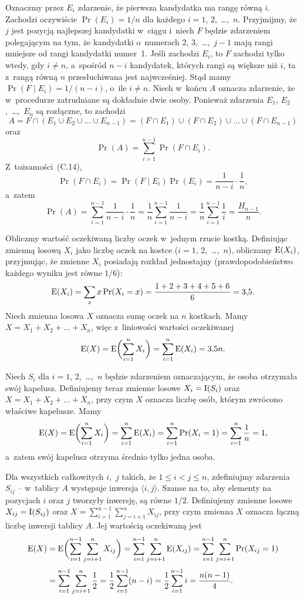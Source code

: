 Oznaczmy przez $E_i$ zdarzenie, że pierwsza kandydatka ma rangę równą $i$. Zachodzi oczywiście $\Pr(E_i)=1/n$ dla każdego $i=1$, 2,~\dots,~$n$. Przyjmijmy, że $j$ jest pozycją najlepszej kandydatki w~ciągu i~niech $F$ będzie zdarzeniem polegającym na tym, że kandydatki o~numerach 2, 3,~\dots,~$j-1$ mają rangi mniejsze od rangi kandydatki numer~1. Jeśli zachodzi $E_i$, to $F$ zachodzi tylko wtedy, gdy $i\ne n$, a~spośród $n-i$ kandydatek, których rangi są większe niż $i$, ta z~rangą równą $n$ przesłuchiwana jest najwcześniej. Stąd mamy $\Pr(F\mid E_i)=1/(n-i)$, o~ile $i\ne n$. Niech w~końcu $A$ oznacza zdarzenie, że w~procedurze  zatrudniane są dokładnie dwie osoby. Ponieważ zdarzenia $E_1$, $E_2$,~\dots,~$E_n$ są rozłączne, to zachodzi
\[
	A = F\cap(E_1\cup E_2\cup\dots\cup E_{n-1}) = (F\cap E_1)\cup(F\cap E_2)\cup\dots\cup(F\cap E_{n-1})
\]
oraz
\[
	\Pr(A) = \sum_{i=1}^{n-1}\Pr(F\cap E_i).
\]
Z~tożsamości~(C.14),
\[
	\Pr(F\cap E_i) = \Pr(F\mid E_i)\Pr(E_i) = \frac{1}{n-i}\cdot\frac{1}{n},
\]
a~zatem
\[
	\Pr(A) = \sum_{i=1}^{n-1}\frac{1}{n-i}\cdot\frac{1}{n} = \frac{1}{n}\sum_{i=1}^{n-1}\frac{1}{n-i} = \frac{1}{n}\sum_{i=1}^{n-1}\frac{1}{i} = \frac{H_{n-1}}{n}.
\]

\exercise %
Obliczmy wartość oczekiwaną liczby oczek w~jednym rzucie kostką. Definiując zmienną losową $X_i$ jako liczbę oczek na  kostce ($i=1$, 2,~\dots,~$n$), obliczamy $\operatorname{E}(X_i)$, przyjmując, że zmienne $X_i$ posiadają rozkład jednostajny (prawdopodobieństwo każdego wyniku jest równe $1/6$):
\[
	\operatorname{E}(X_i) = \sum_xx\Pr(X_i=x) = \frac{1+2+3+4+5+6}{6} = 3{,}5.
\]
Niech zmienna losowa $X$ oznacza sumę oczek na $n$ kostkach. Mamy $X=X_1+X_2+\dots+X_n$, więc z~liniowości wartości oczekiwanej
\[
	\operatorname{E}(X) = \operatorname{E}\biggl(\sum_{i=1}^nX_i\biggr) = \sum_{i=1}^n\operatorname{E}(X_i) = 3{,}5n.
\]

\exercise %
Niech $S_i$ dla $i=1$, 2,~\dots,~$n$ będzie zdarzeniem oznaczającym, że  osoba otrzymała swój kapelusz. Definiujemy teraz zmienne losowe $X_i=\operatorname{I}(S_i)$ oraz $X=X_1+X_2+\dots+X_n$, przy czym $X$ oznacza liczbę osób, którym zwrócono właściwe kapelusze. Mamy
\[
	\operatorname{E}(X) = \operatorname{E}\biggl(\sum_{i=1}^nX_i\biggr) = \sum_{i=1}^n\operatorname{E}(X_i) = \sum_{i=1}^n\Pr(X_i=1) = \sum_{i=1}^n\frac{1}{n} = 1,
\]
a~zatem swój kapelusz otrzyma średnio tylko jedna osoba.

\exercise %
Dla wszystkich całkowitych $i$,~$j$ takich, że $1\le i<j\le n$, zdefiniujmy zdarzenia $S_{ij}$ -- w~tablicy $A$ występuje inwersja $\langle i,j\rangle$. Szanse na to, aby elementy na pozycjach $i$ oraz $j$ tworzyły inwersję, są równe $1/2$. Definiujemy zmienne losowe $X_{ij}=\operatorname{I}(S_{ij})$ oraz $X=\sum_{i=1}^{n-1}\sum_{j=i+1}^nX_{ij}$, przy czym zmienna $X$ oznacza łączną liczbę inwersji tablicy $A$. Jej wartością oczekiwaną jest
\begin{align*}
	\operatorname{E}(X) &= \operatorname{E}\biggl(\sum_{i=1}^{n-1}\sum_{j=i+1}^nX_{ij}\biggr) = \sum_{i=1}^{n-1}\sum_{j=i+1}^n\operatorname{E}(X_{ij}) = \sum_{i=1}^{n-1}\sum_{j=i+1}^n\Pr(X_{ij}=1) \\[1mm]
	&= \sum_{i=1}^{n-1}\sum_{j=i+1}^n\frac{1}{2} = \frac{1}{2}\sum_{i=1}^{n-1}(n-i) = \frac{1}{2}\sum_{i=1}^{n-1}i = \frac{n(n-1)}{4}.
\end{align*}

